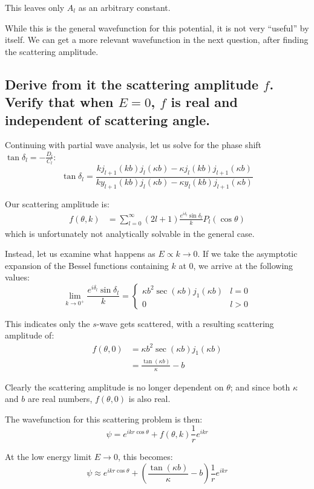 \documentclass[a4paper]{scrartcl}
\begin{document}
This leaves only \(A_l\) as an arbitrary constant.

While this is the general wavefunction for this potential, it is not very ``useful'' by itself. We can get a more relevant wavefunction in the next question, after finding the scattering amplitude.

\subsection{Derive from it the scattering amplitude \(f\). Verify that when \(E = 0\), \(f\) is real and independent of scattering angle.}
Continuing with partial wave analysis, let us solve for the phase shift \(\tan \delta_l = -\frac{D_l}{C_l}\):
\[\tan \delta_l = \frac{k j_{l + 1}(k b) j_l(\kappa b) - \kappa j_l(k b) j_{l + 1}(\kappa b)}{k y_{l + 1}(k b) j_l(\kappa b) - \kappa y_l(k b) j_{l + 1}(\kappa b)}\]

Our scattering amplitude is:
\begin{align*}
    f(\theta, k) &= \sum_{l = 0}^\infty (2 l + 1) \frac{e^{i \delta_l} \sin \delta_l}{k} P_l(\cos \theta)
\end{align*}
which is unfortunately not analytically solvable in the general case.

Instead, let us examine what happens as \(E \propto k \to 0\). If we take the asymptotic expansion of the Bessel functions containing \(k\) at 0, we arrive at the following values:
\[\lim_{k \to 0^+} \frac{e^{i \delta_l} \sin \delta_l}{k} = \begin{cases}
    \kappa b^2 \sec(\kappa b) j_1(\kappa b) & l = 0 \\
    0 & l > 0
\end{cases}\]

This indicates only the \(s\)-wave gets scattered, with a resulting scattering amplitude of:
\begin{align*}
    f(\theta, 0) &= \kappa b^2 \sec(\kappa b) j_1(\kappa b) \\
    &= \frac{\tan (\kappa b)}{\kappa} - b
\end{align*}

Clearly the scattering amplitude is no longer dependent on \(\theta\); and since both \(\kappa\) and \(b\) are real numbers, \(f(\theta, 0)\) is also real.

The wavefunction for this scattering problem is then:
\[\psi = e^{i k r \cos \theta} + f(\theta, k) \frac{1}{r} e^{i k r}\]

At the low energy limit \(E \to 0\), this becomes:
\[\psi \approx e^{i k r \cos \theta} + \left(\frac{\tan (\kappa b)}{\kappa} - b\right) \frac{1}{r} e^{i k r}\]
\end{document}
